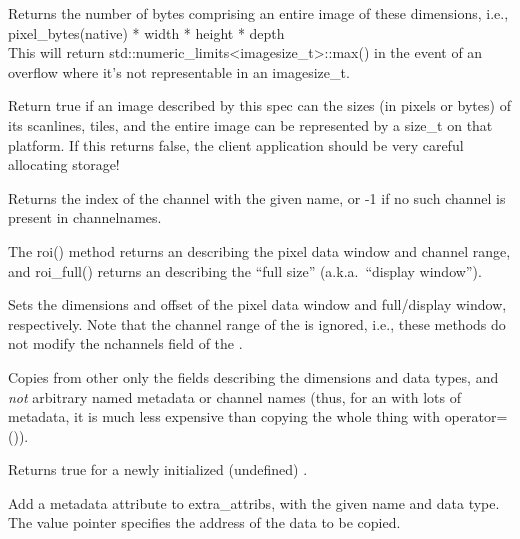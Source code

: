 Returns the number of bytes comprising an entire image of these
dimensions, i.e., \\
{\cf pixel_bytes(native) * width * height * depth } \\
This will return {\cf std::numeric_limits<imagesize_t>::max()} in the event
of an overflow where it's not representable in an {\cf imagesize_t}.
\apiend

Return {\cf true} if an image described by this spec can the sizes
(in pixels or bytes) of its scanlines, tiles, and the entire image can
be represented by a {\cf size_t} on that platform.  If this returns
{\cf false}, the client application should be very careful allocating
storage!
\apiend

Returns the index of the channel with the given name, or -1 if no such
channel is present in {\cf channelnames}.
\apiend

\NEW %
The {\cf roi()} method returns an \ROI describing the pixel data window and
channel range, and {\cf roi_full()} returns an \ROI describing the ``full
size'' (a.k.a.\ ``display window'').
\apiend

\NEW %
Sets the dimensions and offset of the pixel data window and full/display
window, respectively. Note that the channel range of the \ROI is ignored,
i.e., these methods do not modify the {\cf nchannels} field of the \ImageSpec.
\apiend

\NEW %
Copies from {\cf other} only the fields describing the dimensions and
data types, and \emph{not} arbitrary named metadata or channel names (thus,
for an \ImageSpec with lots of metadata, it is much less expensive than
copying the whole thing with {\cf operator=()}).
\apiend

\NEW %
Returns {\cf true} for a newly initialized (undefined) \ImageSpec.
\apiend



Add a metadata attribute to {\cf extra_attribs}, with the given name and
data type.  The {\cf value} pointer specifies
the address of the data to be copied.
\apiend

